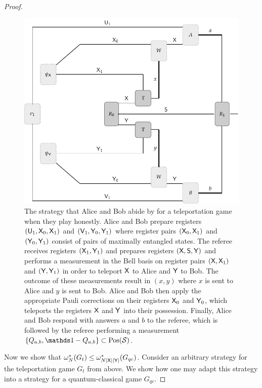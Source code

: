 \begin{proof}
\begin{figure}[!htpb] 
	\begin{center}
		\includegraphics[scale=1.0]{figures/teleportation_game_strategy.pdf}
	\end{center}
		\caption[A teleportation game strategy.]{The strategy that Alice and Bob abide by for a teleportation game when they play honestly. Alice and Bob prepare registers $( \mathsf{U}_1, \mathsf{X}_0, \mathsf{X}_1 )$ and $( \mathsf{V}_1, \mathsf{Y}_0, \mathsf{Y}_1 )$ where register pairs $(\mathsf{X}_0, \mathsf{X}_1)$ and $(\mathsf{Y}_0, \mathsf{Y}_1)$ consist of pairs of maximally entangled states. The referee receives registers $(\mathsf{X}_1,\mathsf{Y}_1)$ and prepares registers $(\mathsf{X},\mathsf{S},\mathsf{Y})$ and performs a measurement in the Bell basis on register pairs $(\mathsf{X},\mathsf{X}_1)$ and $(\mathsf{Y},\mathsf{Y}_1)$ in order to teleport $\mathsf{X}$ to Alice and $\mathsf{Y}$ to Bob. The outcome of these measurements result in $(x,y)$ where $x$ is sent to Alice and $y$ is sent to Bob. Alice and Bob then apply the appropriate Pauli corrections on their registers $\mathsf{X}_0$ and $\mathsf{Y}_0$, which teleports the registers $\mathsf{X}$ and $\mathsf{Y}$ into their possession. Finally, Alice and Bob respond with answers $a$ and $b$ to the referee, which is followed by the referee performing a measurement $\{Q_{a,b}, \I - Q_{a,b} \} \subset \Pos(\S)$.}
		\label{fig:teleportation-game-strategy}
\end{figure}

Now we show that $\omega_{N}^*(G_t) \leq \omega_{N\left\lvert \mathsf{X} \right\rvert\left\lvert \mathsf{Y} \right\rvert}^*(G_{qc})$. Consider an arbitrary strategy for the teleportation game $G_t$ from above. We show how one may adapt this strategy into a strategy for a quantum-classical game $G_{qc}$. 


\end{proof}
